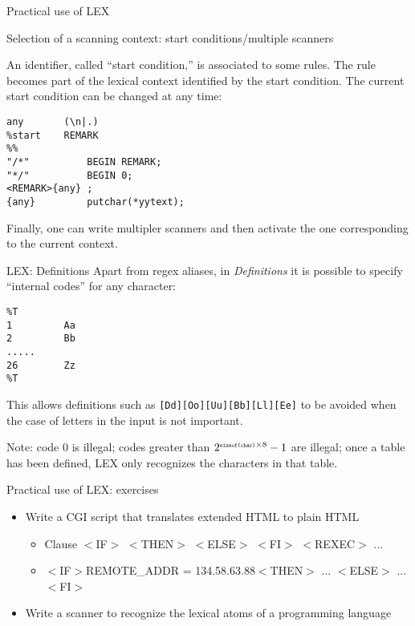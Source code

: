 \begin{frame}[fragile]{Practical use of LEX}
\begin{center}{Selection of a scanning context: start conditions/multiple scanners}
\end{center}


\vspace{20pt}

An identifier, called ``start condition,'' is associated
to some rules. The rule becomes part of the lexical context
identified by the start condition. The current start condition
can be changed at any time:


\vspace{20pt}

\begin{verbatim}
any       (\n|.)
%start    REMARK
%%
"/*"          BEGIN REMARK;
"*/"          BEGIN 0;
<REMARK>{any} ;
{any}         putchar(*yytext);
\end{verbatim}


\vspace{20pt}

Finally, one can write multipler scanners and then activate
the one corresponding to the current context.

\end{frame}
\begin{frame}[fragile]{LEX: Definitions}
Apart from regex aliases, in {\em Definitions\/} it is possible to specify
``internal codes'' for any character:


\vspace{20pt}

\begin{verbatim}
%T
1         Aa
2         Bb
.....
26        Zz
%T
\end{verbatim}


\vspace{20pt}

This allows definitions such as
\verb"[Dd][Oo][Uu][Bb][Ll][Ee]"
to be avoided when the case of letters in the input is not important.


\vspace{20pt}

Note: code 0 is illegal;
codes greater than $2^{\hbox{\tiny\tt sizeof(char)}\times8}-1$ are illegal;
once a table has been defined, LEX only recognizes the characters in that table. 

\end{frame}
\begin{frame}[fragile]{Practical use of LEX: exercises}
\begin{itemize}
\item Write a CGI script that translates extended HTML to plain HTML
	\begin{itemize}
	\item Clause $<$IF$>$ $<$THEN$>$ $<$ELSE$>$ $<$FI$>$ $<$REXEC$>$ ...
	\item $<$IF$>$REMOTE\_ADDR = 134.58.63.88$<$THEN$>$ ... $<$ELSE$>$ ... $<$FI$>$
	\end{itemize}
\item Write a scanner to recognize the lexical atoms of a programming language
\end{itemize}

\end{frame}
